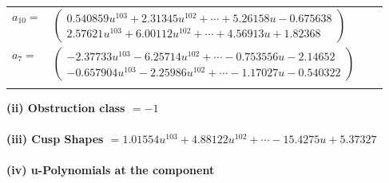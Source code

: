 \documentclass[1p]{elsarticle_modified}
\theoremstyle{definition}
\begin{document}
\begin{tabular}{m{7pt} m{180pt} m{7pt} m{180pt} }
\flushright $a_{10}=$&$\begin{pmatrix}0.540859 u^{103}+2.31345 u^{102}+\cdots+5.26158 u-0.675638\\2.57621 u^{103}+6.00112 u^{102}+\cdots+4.56913 u+1.82368\end{pmatrix}$ \\
\flushright $a_{7}=$&$\begin{pmatrix}-2.37733 u^{103}-6.25714 u^{102}+\cdots-0.753556 u-2.14652\\-0.657904 u^{103}-2.25986 u^{102}+\cdots-1.17027 u-0.540322\end{pmatrix}$\\&\end{tabular}
\flushleft \textbf{(ii) Obstruction class $= -1$}\\~\\
\flushleft \textbf{(iii) Cusp Shapes $= 1.01554 u^{103}+4.88122 u^{102}+\cdots-15.4275 u+5.37327$}\\~\\
\newpage\renewcommand{\arraystretch}{1}
\flushleft \textbf{(iv) u-Polynomials at the component}\newline \\
\end{document}
